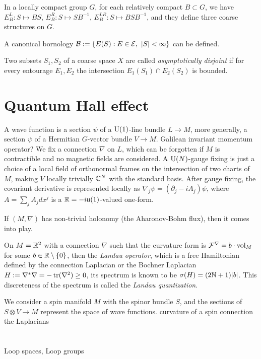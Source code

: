 \documentclass{../../large}
\begin{document}
In a locally compact group $G$, for each relatively compact $B\subset G$, we have $E_B^L:S\mapsto BS$, $E_B^R:S\mapsto SB^{-1}$, $E_B^{LR}:S\mapsto BSB^{-1}$, and they define three coarse structures on $G$.

A canonical bornology $\mathcal{B}:=\{E(S):E\in\mathcal{E},\ |S|<\infty\}$ can be defined.

Two subsets $S_1,S_2$ of a coarse space $X$ are called \emph{asymptotically disjoint} if for every entourage $E_1,E_2$ the intersection $E_1(S_1)\cap E_2(S_2)$ is bounded.

\section{Quantum Hall effect}



A wave function is a section $\psi$ of a $\mathrm{U}(1)$-line bundle $L\to M$, more generally, a section $\psi$ of a Hermitian $G$-vector bundle $V\to M$.
Galilean invariant momentum operator?
We fix a connection $\nabla$ on $L$, which can be forgotten if $M$ is contractible and no magnetic fields are considered.
A $\mathrm{U}(N)$-gauge fixing is just a choice of a local field of orthonormal frames on the intersection of two charts of $M$, making $V$ locally trivially $\mathbb{C}^N$ with the standard basis.
After gauge fixing, the covariant derivative is represented locally as $\nabla_j\psi=(\partial_j-iA_j)\psi$, where $A=\sum_jA_jdx^j$ is a $\mathbb{R}=-i\mathfrak{u}(1)$-valued one-form.

If $(M,\nabla)$ has non-trivial holonomy (the Aharonov-Bohm flux), then it comes into play.


On $M=\mathbb{R}^2$ with a connection $\nabla$ such that the curvature form is $\mathcal{F}^\nabla=b\cdot\operatorname{vol}_M$ for some $b\in\mathbb{R}\setminus\{0\}$, then the \emph{Landau operator}, which is a free Hamiltonian defined by the connection Laplacian or the Bochner Laplacian $H:=\nabla^*\nabla=-\operatorname{tr}(\nabla^2)\ge0$, its spectrum is known to be $\sigma(H)=(2\mathbb{N}+1)|b|$.
This discreteness of the spectrum is called the \emph{Landau quantization}.


We consider a spin manifold $M$ with the spinor bundle $S$, and the sections of $S\otimes V\to M$ represent the space of wave functions.
curvature of a spin connection
the Laplacians


\section{}

Loop spaces,
Loop groups
\end{document}
